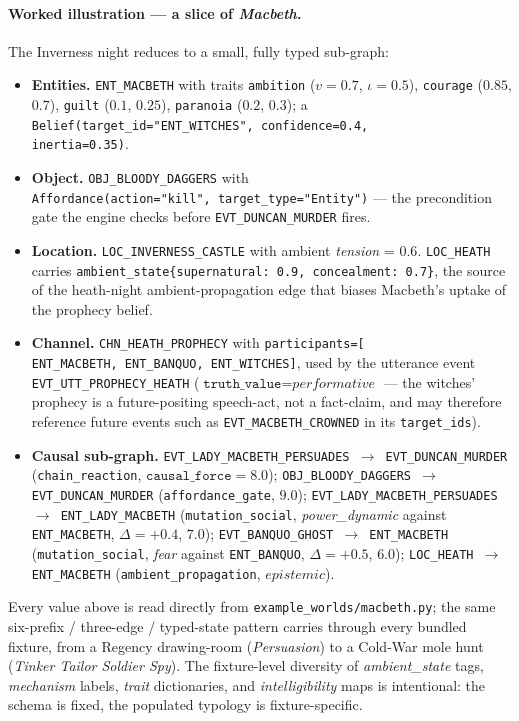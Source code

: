 \documentclass[11pt]{article}
\begin{document}
\paragraph{Worked illustration --- a slice of \emph{Macbeth}.}
The Inverness night reduces to a small, fully typed sub-graph:
\begin{itemize}\itemsep1pt
\item \textbf{Entities.} \texttt{ENT\_MACBETH} with traits
      \texttt{ambition} ($v\!=\!0.7$, $\iota\!=\!0.5$),
      \texttt{courage} ($0.85$, $0.7$), \texttt{guilt}
      ($0.1$, $0.25$), \texttt{paranoia} ($0.2$, $0.3$); a
      \texttt{Belief(target\_id="ENT\_WITCHES",\ confidence=0.4,\ \\
      inertia=0.35)}.
\item \textbf{Object.} \texttt{OBJ\_BLOODY\_DAGGERS} with
      \texttt{Affordance(action="kill",\ target\_type="Entity")}
      --- the precondition gate the engine checks before
      \texttt{EVT\_DUNCAN\_MURDER} fires.
\item \textbf{Location.} \texttt{LOC\_INVERNESS\_CASTLE} with
      ambient \textit{tension} = $0.6$.
      \texttt{LOC\_HEATH} carries
      \texttt{ambient\_state\{supernatural:\ 0.9,\
      concealment:\ 0.7\}}, the source of the heath-night
      ambient-propagation edge that biases Macbeth's uptake of
      the prophecy belief.
\item \textbf{Channel.} \texttt{CHN\_HEATH\_PROPHECY} with
      \texttt{participants=[\\
      ENT\_MACBETH,\ ENT\_BANQUO,\ ENT\_WITCHES]}, used by the
      utterance event \texttt{EVT\_UTT\_PROPHECY\_HEATH}
      ($\texttt{truth\_value}=\textit{performative}$ --- the witches'
      prophecy is a future-positing speech-act, not a fact-claim,
      and may therefore reference future events such as
      \texttt{EVT\_MACBETH\_CROWNED} in its \texttt{target\_ids}).
\item \textbf{Causal sub-graph.} \texttt{EVT\_LADY\_MACBETH\_PERSUADES
      $\to$ EVT\_DUNCAN\_MURDER} (\texttt{chain\_reaction},
      $\texttt{causal\_force}=8.0$); \texttt{OBJ\_BLOODY\_DAGGERS
      $\to$ EVT\_DUNCAN\_MURDER} (\texttt{affordance\_gate},
      $9.0$); \texttt{EVT\_LADY\_MACBETH\_PERSUADES $\to$
      ENT\_LADY\_MACBETH} (\texttt{mutation\_social},
      \emph{power\_dynamic} against \texttt{ENT\_MACBETH},
      $\Delta=+0.4$, $7.0$); \texttt{EVT\_BANQUO\_GHOST $\to$
      ENT\_MACBETH} (\texttt{mutation\_social}, \emph{fear}
      against \texttt{ENT\_BANQUO}, $\Delta=+0.5$, $6.0$);
      \texttt{LOC\_HEATH $\to$ ENT\_MACBETH}
      (\texttt{ambient\_propagation}, $\textit{epistemic}$).
\end{itemize}
Every value above is read directly from
\texttt{example\_worlds/macbeth.py}; the same six-prefix /
three-edge / typed-state pattern carries through every bundled
fixture, from a Regency drawing-room (\emph{Persuasion}) to a
Cold-War mole hunt (\emph{Tinker Tailor Soldier Spy}). The
fixture-level diversity of \emph{ambient\_state} tags,
\emph{mechanism} labels, \emph{trait} dictionaries, and
\emph{intelligibility} maps is intentional: the schema is fixed,
the populated typology is fixture-specific.
\end{document}
